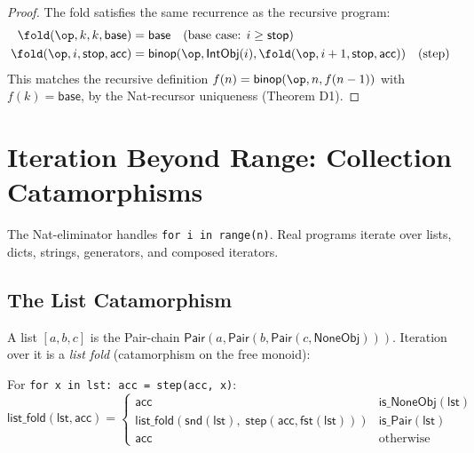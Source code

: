 \begin{proof}
The fold satisfies the same recurrence as the recursive program:
\begin{align}
  \fold(\op, k, k, \mathsf{base}) &= \mathsf{base}
    \quad \text{(base case: $i \geq \mathsf{stop}$)} \\
  \fold(\op, i, \mathsf{stop}, \mathsf{acc}) &=
    \mathsf{binop}(\op, \mathsf{IntObj}(i),
    \fold(\op, i+1, \mathsf{stop}, \mathsf{acc}))
    \quad \text{(step)}
\end{align}
This matches the recursive definition
$f(n) = \mathsf{binop}(\op, n, f(n-1))$ with $f(k) = \mathsf{base}$,
by the Nat-recursor uniqueness (Theorem D1).
\end{proof}


\chapter{Iteration Beyond Range: Collection Catamorphisms}
\label{ch:iteration-beyond}

The Nat-eliminator handles \texttt{for i in range(n)}.  Real programs
iterate over lists, dicts, strings, generators, and composed iterators.

\section{The List Catamorphism}

A list $[a,b,c]$ is the Pair-chain $\mathsf{Pair}(a, \mathsf{Pair}(b,
\mathsf{Pair}(c, \mathsf{NoneObj})))$.  Iteration over it is a
\emph{list fold} (catamorphism on the free monoid):

\begin{definition}
\label{def:list-fold}
For \texttt{for x in lst: acc = step(acc, x)}:
\[
  \mathsf{list\_fold}(\mathsf{lst}, \mathsf{acc}) = \begin{cases}
    \mathsf{acc} & \mathsf{is\_NoneObj}(\mathsf{lst}) \\
    \mathsf{list\_fold}(\mathsf{snd}(\mathsf{lst}),\;
      \mathsf{step}(\mathsf{acc}, \mathsf{fst}(\mathsf{lst})))
      & \mathsf{is\_Pair}(\mathsf{lst}) \\
    \mathsf{acc} & \text{otherwise}
  \end{cases}
\]
\end{definition}

